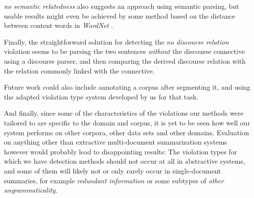 \documentclass[a4paper,10pt]{scrartcl}
\theoremstyle{style}
\begin{document}
\textit{no semantic relatedness} also suggests an approach using semantic parsing, but usable results might even be achieved by some method based on the distance between content words in \textit{WordNet} \citep{fellbaum2005wordnet}.

Finally, the straightforward solution for detecting the \textit{no discourse relation} violation seems to be parsing the two sentences \textit{without} the discourse connective using a discourse parser, and then comparing the derived discourse relation with the relation commonly linked with the connective.

Future work could also include annotating a corpus after segmenting it, and using the adapted violation type system developed by us for that task.

And finally, since some of the characteristics of the violations our methods were tailored to are specific to the domain and corpus, it is yet to be seen how well our system performs on other corpora, other data sets and other domains.
Evaluation on anything other than extractive multi-document summarization systems however would probably lead to disappointing results: The violation types for which we have detection methods should not occur at all in abstractive systems, and some of them will likely not or only rarely occur in single-document summaries, for example \textit{redundant information} or some subtypes of \textit{other ungrammaticality}.

\newpage


\end{document}

